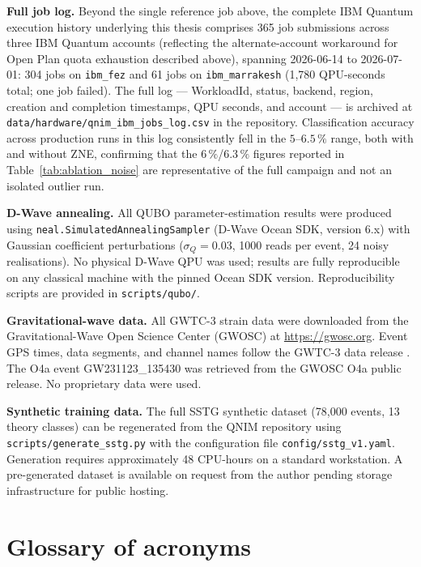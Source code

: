 \documentclass[11pt,a4paper, english]{book}
\theoremstyle{plain}
\theoremstyle{definition}
\numberwithin{equation}{chapter}
\numberwithin{figure}{chapter}
\numberwithin{table}{chapter}
\begin{document}
\noindent\textbf{Full job log.} Beyond the single reference job above,
the complete IBM Quantum execution history underlying this thesis
comprises 365 job submissions across three IBM Quantum accounts
(reflecting the alternate-account workaround for Open Plan quota
exhaustion described above), spanning 2026-06-14 to 2026-07-01: 304
jobs on \texttt{ibm\_fez} and 61 jobs on \texttt{ibm\_marrakesh}
(1,780 QPU-seconds total; one job failed). The full log --- WorkloadId,
status, backend, region, creation and completion timestamps, QPU
seconds, and account --- is archived at
\texttt{data/hardware/qnim\_ibm\_jobs\_log.csv} in the repository.
Classification accuracy across production runs in this log consistently
fell in the $5$--$6.5\,\%$ range, both with and without ZNE, confirming
that the $6\,\%$/$6.3\,\%$ figures reported in
Table~\ref{tab:ablation_noise} are representative of the full campaign
and not an isolated outlier run.

\noindent\textbf{D-Wave annealing.} All QUBO parameter-estimation results 
were produced using \texttt{neal.SimulatedAnnealingSampler} (D-Wave Ocean 
SDK, version 6.x) with Gaussian coefficient perturbations 
($\sigma_Q = 0.03$, 1000 reads per event, 24 noisy realisations). No 
physical D-Wave QPU was used; results are fully reproducible on any 
classical machine with the pinned Ocean SDK version. Reproducibility 
scripts are provided in \texttt{scripts/qubo/}.

\noindent\textbf{Gravitational-wave data.} All GWTC-3 strain data were 
downloaded from the Gravitational-Wave Open Science Center (GWOSC) at 
\url{https://gwosc.org}. Event GPS times, data segments, and channel 
names follow the GWTC-3 data release \cite{GWTC3_2023}. The O4a event 
GW231123\_135430 was retrieved from the GWOSC O4a public release. No 
proprietary data were used.

\noindent\textbf{Synthetic training data.} The full SSTG synthetic 
dataset (78,000 events, 13 theory classes) can be regenerated from the 
QNIM repository using \texttt{scripts/generate\_sstg.py} with the 
configuration file \texttt{config/sstg\_v1.yaml}. Generation requires 
approximately 48 CPU-hours on a standard workstation. A pre-generated 
dataset is available on request from the author pending storage 
infrastructure for public hosting.


\chapter{Glossary of acronyms}
\label{app:glossary}
\end{document}
